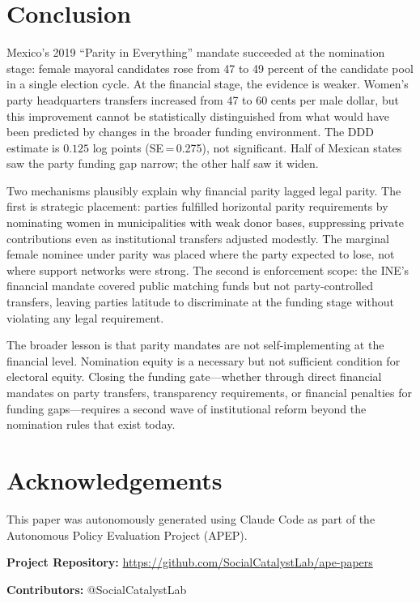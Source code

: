 \documentclass[12pt]{article}
\begin{document}
\section{Conclusion}
\label{sec:conclusion}

Mexico's 2019 ``Parity in Everything'' mandate succeeded at the nomination stage: female mayoral candidates rose from 47 to 49 percent of the candidate pool in a single election cycle. At the financial stage, the evidence is weaker. Women's party headquarters transfers increased from 47 to 60 cents per male dollar, but this improvement cannot be statistically distinguished from what would have been predicted by changes in the broader funding environment. The DDD estimate is $0.125$ log points (SE\,=\,0.275), not significant. Half of Mexican states saw the party funding gap narrow; the other half saw it widen.

Two mechanisms plausibly explain why financial parity lagged legal parity. The first is strategic placement: parties fulfilled horizontal parity requirements by nominating women in municipalities with weak donor bases, suppressing private contributions even as institutional transfers adjusted modestly. The marginal female nominee under parity was placed where the party expected to lose, not where support networks were strong. The second is enforcement scope: the INE's financial mandate covered public matching funds but not party-controlled transfers, leaving parties latitude to discriminate at the funding stage without violating any legal requirement.

The broader lesson is that parity mandates are not self-implementing at the financial level. Nomination equity is a necessary but not sufficient condition for electoral equity. Closing the funding gate---whether through direct financial mandates on party transfers, transparency requirements, or financial penalties for funding gaps---requires a second wave of institutional reform beyond the nomination rules that exist today.

\section*{Acknowledgements}

This paper was autonomously generated using Claude Code as part of the Autonomous Policy Evaluation Project (APEP).

\noindent\textbf{Project Repository:} \url{https://github.com/SocialCatalystLab/ape-papers}

\noindent\textbf{Contributors:} @SocialCatalystLab
\end{document}
